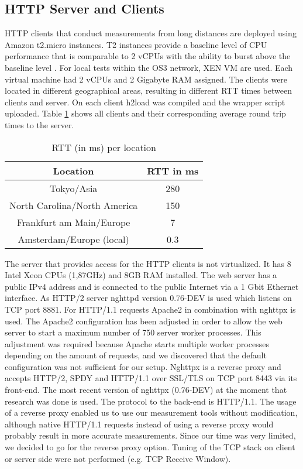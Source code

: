 \subsection{HTTP Server and Clients}
\label{subsec:server_client}
HTTP clients that conduct measurements from long distances are deployed using Amazon t2.micro instances. T2 instances provide a baseline level of CPU performance that is comparable to 2 vCPUs with the ability to burst above the baseline level \cite{amazon-ts}. For local tests within the OS3 network, XEN VM are used. Each virtual machine had 2 vCPUs and 2 Gigabyte RAM assigned. The clients were located in different geographical areas, resulting in different RTT times between clients and server. On each client h2load was compiled and the wrapper script uploaded. Table \ref{table:locations} shows all clients and their corresponding average round trip times to the server.

\begin{table}[h]
	\centering
\begin{tabular}{ | c | c | }

\hline
\textbf{Location} & \textbf{RTT in ms}\\ \hline \hline
Tokyo/Asia &  280\\ \hline
North Carolina/North America &  150\\ \hline 
Frankfurt am Main/Europe &  7\\ \hline
Amsterdam/Europe (local) &  0.3\\

\hline
\end{tabular}
\caption{RTT (in ms) per location}
\label{table:locations}
\end{table}


The server that provides access for the HTTP clients is not virtualized. It has 8 Intel Xeon CPUs (1,87GHz) and 8GB RAM installed. The web server has a public IPv4 address and is connected to the public Internet via a 1 Gbit Ethernet interface. As HTTP/2 server nghttpd \cite{nghttp} version 0.76-DEV is used which listens on TCP port 8881. For HTTP/1.1 requests Apache2 \cite{apache2} in combination with nghttpx \cite{nghttpx} is used. The Apache2 configuration has been adjusted in order to allow the web server to start a maximum number of 750 server worker processes. This adjustment was required because Apache starts multiple worker processes depending on the amount of requests, and we discovered that the default configuration was not sufficient for our setup. Nghttpx is a reverse proxy and accepts HTTP/2, SPDY and HTTP/1.1 over SSL/TLS on TCP port 8443 via its front-end. The most recent version of nghttpx (0.76-DEV) at the moment that research was done is used. The protocol to the back-end is HTTP/1.1. The usage of a reverse proxy enabled us to use our measurement tools without modification, although native HTTP/1.1 requests instead of using a reverse proxy would probably result in more accurate measurements. Since our time was very limited, we decided to go for the reverse proxy option. Tuning of the TCP stack on client or server side were not performed (e.g. TCP Receive Window).

